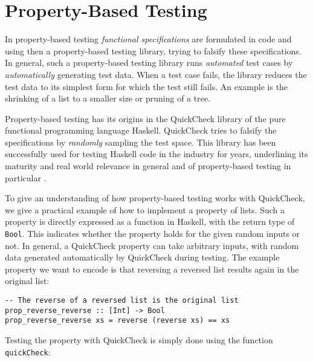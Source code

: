 \section{Property-Based Testing}
\label{sec:proptesting}
In property-based testing \textit{functional specifications} are formulated in code and using then a property-based testing library, trying to falsify these specifications. In general, such a property-based testing library runs \textit{automated} test cases by \textit{automatically} generating test data. When a test case fails, the library reduces the test data to its simplest form for which the test still fails. An example is the shrinking of a list to a smaller size or pruning of a tree.

 Property-based testing has its origins in the QuickCheck library \cite{claessen_quickcheck_2000,claessen_testing_2002} of the pure functional programming language Haskell. QuickCheck tries to falsify the specifications by \textit{randomly} sampling the test space. This library has been successfully used for testing Haskell code in the industry for years, underlining its maturity and real world relevance in general and of property-based testing in particular \cite{hughes_quickcheck_2007}.

To give an understanding of how property-based testing works with QuickCheck, we give a practical example of how to implement a property of lists. Such a property is directly expressed as a function in Haskell, with the return type of \texttt{Bool}. This indicates whether the property holds for the given random inputs or not. In general, a QuickCheck property can take arbitrary inputs, with random data generated automatically by QuickCheck during testing. The example property we want to encode is that reversing a reversed list results again in the original list:

\begin{footnotesize}
\begin{verbatim}
-- The reverse of a reversed list is the original list
prop_reverse_reverse :: [Int] -> Bool
prop_reverse_reverse xs = reverse (reverse xs) == xs
\end{verbatim}
\end{footnotesize}

Testing the property with QuickCheck is simply done using the function \\ \texttt{quickCheck}:


